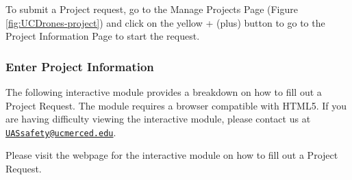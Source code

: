 \documentclass[
  12pt,
]{book}
\begin{document}
To submit a Project request, go to the Manage Projects Page (Figure \ref{fig:UCDrones-project}) and click on the yellow + (plus) button to go to the Project Information Page to start the request.

\subsubsection{Enter Project Information}\label{enter-project-information}

The following interactive module provides a breakdown on how to fill out a Project Request. The module requires a browser compatible with HTML5. If you are having difficulty viewing the interactive module, please contact us at \href{mailto:UASsafety@ucmerced.edu}{\nolinkurl{UASsafety@ucmerced.edu}}.

Please visit the webpage for the interactive module on how to fill out a Project Request.
\end{document}
